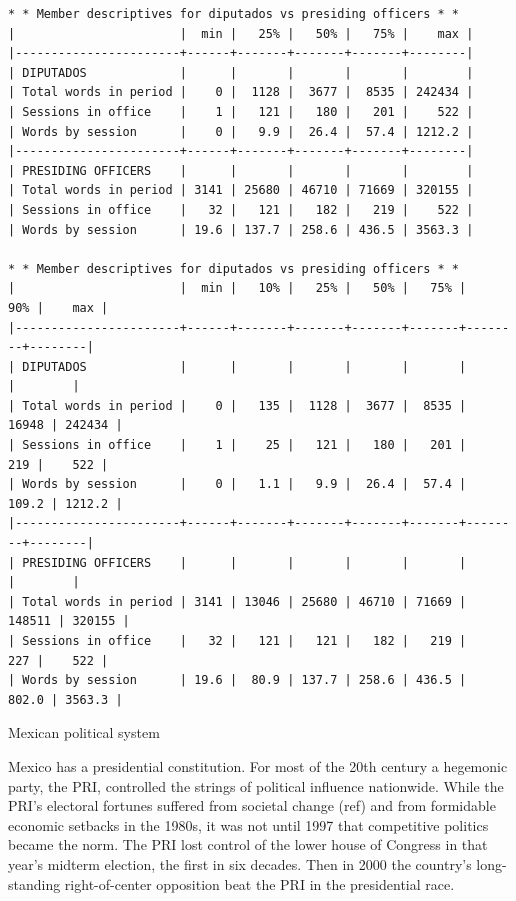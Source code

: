 \documentclass[letter,12pt]{article}
\begin{document}
\singlespacing
\begin{footnotesize}
\begin{verbatim}
* * Member descriptives for diputados vs presiding officers * *
|                       |  min |   25% |   50% |   75% |    max |
|-----------------------+------+-------+-------+-------+--------|
| DIPUTADOS             |      |       |       |       |        |
| Total words in period |    0 |  1128 |  3677 |  8535 | 242434 |
| Sessions in office    |    1 |   121 |   180 |   201 |    522 |
| Words by session      |    0 |   9.9 |  26.4 |  57.4 | 1212.2 |
|-----------------------+------+-------+-------+-------+--------|
| PRESIDING OFFICERS    |      |       |       |       |        |
| Total words in period | 3141 | 25680 | 46710 | 71669 | 320155 |
| Sessions in office    |   32 |   121 |   182 |   219 |    522 |
| Words by session      | 19.6 | 137.7 | 258.6 | 436.5 | 3563.3 |

* * Member descriptives for diputados vs presiding officers * *
|                       |  min |   10% |   25% |   50% |   75% |    90% |    max |
|-----------------------+------+-------+-------+-------+-------+--------+--------|
| DIPUTADOS             |      |       |       |       |       |        |        |
| Total words in period |    0 |   135 |  1128 |  3677 |  8535 |  16948 | 242434 |
| Sessions in office    |    1 |    25 |   121 |   180 |   201 |    219 |    522 |
| Words by session      |    0 |   1.1 |   9.9 |  26.4 |  57.4 |  109.2 | 1212.2 |
|-----------------------+------+-------+-------+-------+-------+--------+--------|
| PRESIDING OFFICERS    |      |       |       |       |       |        |        |
| Total words in period | 3141 | 13046 | 25680 | 46710 | 71669 | 148511 | 320155 |
| Sessions in office    |   32 |   121 |   121 |   182 |   219 |    227 |    522 |
| Words by session      | 19.6 |  80.9 | 137.7 | 258.6 | 436.5 |  802.0 | 3563.3 |

\end{verbatim}
\end{footnotesize}
\doublespacing


Mexican political system

Mexico has a presidential constitution. For most of the 20th century a hegemonic party, the PRI, controlled the strings of political influence nationwide. While the PRI's electoral fortunes suffered from societal change (ref) and from formidable economic setbacks in the 1980s, it was not until 1997 that competitive politics became the norm. The PRI lost control of the lower house of Congress in that year's midterm election, the first in six decades. Then in 2000 the country's long-standing right-of-center opposition beat the PRI in the presidential race. 
\end{document}
